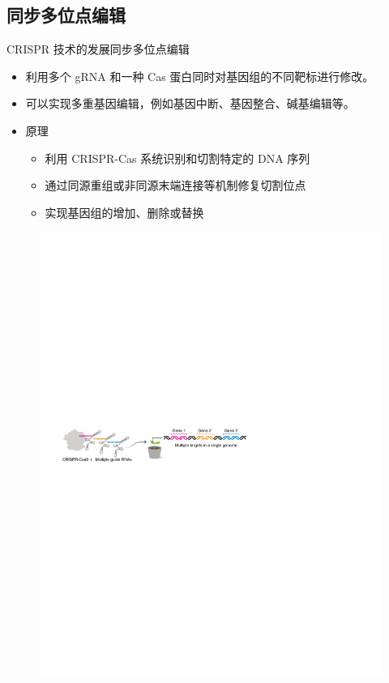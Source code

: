 \documentclass{beamer}
\begin{document}
	\subsection{同步多位点编辑}
	\begin{frame}{CRISPR 技术的发展}{同步多位点编辑}
		\begin{itemize}
			\item 利用多个 gRNA 和一种 Cas 蛋白同时对基因组的不同靶标进行修改。
			\item 可以实现多重基因编辑，例如基因中断、基因整合、碱基编辑等。
			\item 原理
			\begin{itemize}
				\item 利用 CRISPR-Cas 系统识别和切割特定的 DNA 序列
				\item 通过同源重组或非同源末端连接等机制修复切割位点
				\item 实现基因组的增加、删除或替换
			\end{itemize}
		\end{itemize}

		\begin{figure}
			\centering
			\includegraphics[width=\textwidth]{img/muti_edit.pdf}
		\end{figure}
	\end{frame}
\end{document}
